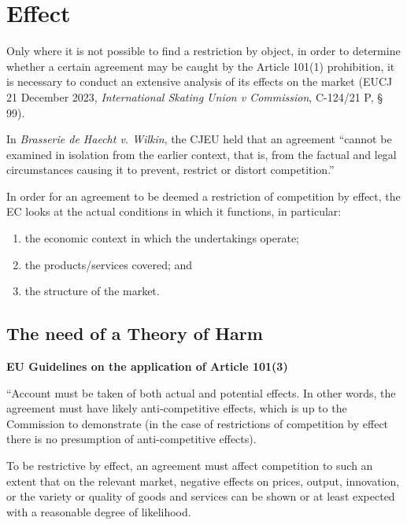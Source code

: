 
\section{Effect}

    Only where it is not possible to find a restriction by object, in order to determine whether a certain agreement may be caught by the Article 101(1) prohibition, it is necessary to conduct an extensive analysis of its effects on the market (EUCJ 21 December 2023, \textit{International Skating Union v Commission}, C-124/21 P, § 99).

    In \textit{Brasserie de Haecht v. Wilkin}, the CJEU held that an agreement “cannot be examined in isolation from the earlier context, that is, from the factual and legal circumstances causing it to prevent, restrict or distort competition.”
    
    In order for an agreement to be deemed a restriction of competition by effect, the EC looks at the actual conditions in which it functions, in particular:
    \begin{enumerate}[label=\roman*.]
        \item the economic context in which the undertakings operate;
        \item the products/services covered; and
        \item the structure of the market.
    \end{enumerate}

    \subsection{The need of a Theory of Harm}

        \textbf{EU Guidelines on the application of Article 101(3)}

        “Account must be taken of both actual and potential effects. In other words, the agreement must have likely anti-competitive effects, which is up to the Commission to demonstrate (in the case of restrictions of competition by effect there is no presumption of anti-competitive effects).
        
        To be restrictive by effect, an agreement must affect competition to such an extent that on the relevant market, negative effects on prices, output, innovation, or the variety or quality of goods and services can be shown or at least expected with a reasonable degree of likelihood.
        
